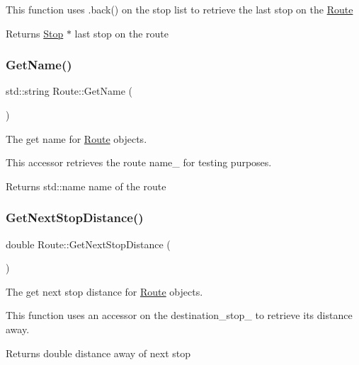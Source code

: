 This function uses .back() on the stop list to retrieve the last stop on the \hyperlink{classRoute}{Route}

\begin{DoxyReturn}{Returns}
\hyperlink{classStop}{Stop} $\ast$ last stop on the route 
\end{DoxyReturn}
\mbox{\label{classRoute_a8d05485fe63fbd66fd093d423667ca61}} 
\subsubsection{\texorpdfstring{Get\+Name()}{GetName()}}
{\footnotesize\ttfamily std\+::string Route\+::\+Get\+Name (\begin{DoxyParamCaption}{ }\end{DoxyParamCaption})}



The get name for \hyperlink{classRoute}{Route} objects. 

This accessor retrieves the route name\+\_\+ for testing purposes.

\begin{DoxyReturn}{Returns}
std\+::name name of the route 
\end{DoxyReturn}
\mbox{\label{classRoute_a81b012b2f33a4ead1b084bd3bc308905}} 
\subsubsection{\texorpdfstring{Get\+Next\+Stop\+Distance()}{GetNextStopDistance()}}
{\footnotesize\ttfamily double Route\+::\+Get\+Next\+Stop\+Distance (\begin{DoxyParamCaption}{ }\end{DoxyParamCaption})}



The get next stop distance for \hyperlink{classRoute}{Route} objects. 

This function uses an accessor on the destination\+\_\+stop\+\_\+ to retrieve its distance away.

\begin{DoxyReturn}{Returns}
double distance away of next stop 
\end{DoxyReturn}
\mbox{\label{classRoute_a2699ed2b1899d8b053cb9363e6dc35b1}} 
